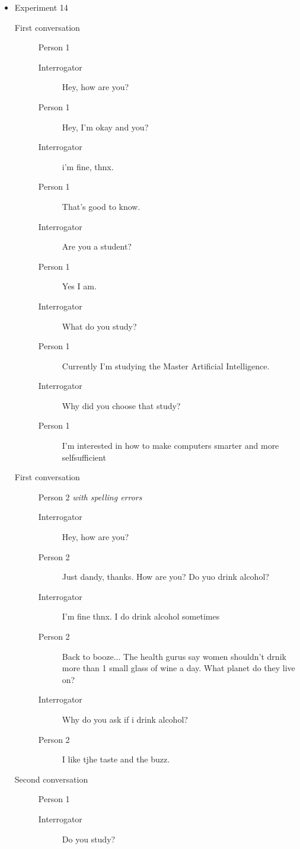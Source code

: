 \begin{itemize}
   \item Experiment 14
      \begin{description}
         \item [First conversation] Person 1
            \begin{description}
               \item [Interrogator] Hey, how are you?
               \item [Person 1] Hey, I'm okay and you?
               \item [Interrogator] i'm fine, thnx.
               \item [Person 1] That's good to know.
               \item [Interrogator] Are you a student?
               \item [Person 1] Yes I am.
               \item [Interrogator] What do you study?
               \item [Person 1] Currently I'm studying the Master Artificial Intelligence.
               \item [Interrogator] Why did you choose that study?
               \item [Person 1] I'm interested in how to make computers smarter and more selfsufficient
            \end{description}
         \item [First conversation] Person 2 \textit{with spelling errors}
            \begin{description}
               \item [Interrogator] Hey, how are you?
               \item [Person 2] Just dandy, thanks. How are you? Do yuo drink alcohol?
               \item [Interrogator] I'm fine thnx. I do drink alcohol sometimes
               \item [Person 2] Back to booze... The health gurus say women shouldn't drnik more than 1 small glass of wine a day. What planet do they live on?
               \item [Interrogator] Why do you ask if i drink alcohol?
               \item [Person 2] I like tjhe taste and the buzz.
            \end{description}
         \item [Second conversation] Person 1
            \begin{description}
               \item [Interrogator] Do you study?

\end{description}
\end{description}
\end{itemize}

